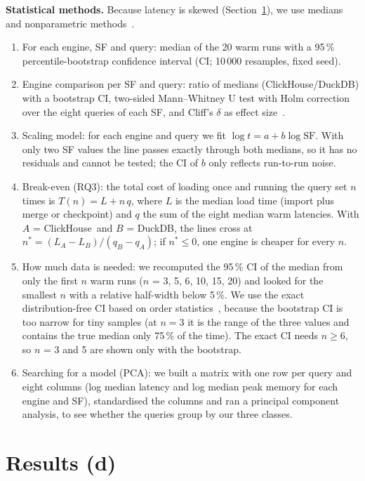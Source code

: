 \documentclass[11pt,a4paper]{article}
\newcommand{\CH}{ClickHouse}
\newcommand{\DK}{DuckDB}
\begin{document}
\textbf{Statistical methods.} Because latency is skewed (Section~\ref{sec:results}), we use medians and nonparametric methods~\cite{hoefler}.
\begin{enumerate}[leftmargin=1.5em]
\item For each engine, SF and query: median of the 20 warm runs with a 95\,\% percentile-bootstrap confidence interval (CI; 10\,000 resamples, fixed seed).
\item Engine comparison per SF and query: ratio of medians (\CH/\DK) with a bootstrap CI, two-sided Mann--Whitney U test with Holm correction over the eight queries of each SF, and Cliff's $\delta$ as effect size~\cite{romano}.
\item Scaling model: for each engine and query we fit $\log t = a + b \log \mathrm{SF}$.
With only two SF values the line passes exactly through both medians, so it has no residuals and cannot be tested; the CI of $b$ only reflects run-to-run noise.
\item Break-even (RQ3): the total cost of loading once and running the query set $n$ times is $T(n) = L + n\,q$, where $L$ is the median load time (import plus merge or checkpoint) and $q$ the sum of the eight median warm latencies.
With $A$ = \CH\ and $B$ = \DK, the lines cross at $n^* = (L_A - L_B)/(q_B - q_A)$; if $n^* \le 0$, one engine is cheaper for every $n$.
\item How much data is needed: we recomputed the 95\,\% CI of the median from only the first $n$ warm runs ($n$ = 3, 5, 6, 10, 15, 20) and looked for the smallest $n$ with a relative half-width below 5\,\%.
We use the exact distribution-free CI based on order statistics~\cite{leboudec}, because the bootstrap CI is too narrow for tiny samples (at $n = 3$ it is the range of the three values and contains the true median only 75\,\% of the time). The exact CI needs $n \ge 6$, so $n$ = 3 and 5 are shown only with the bootstrap.
\item Searching for a model (PCA): we built a matrix with one row per query and eight columns (log median latency and log median peak memory for each engine and SF), standardised the columns and ran a principal component analysis, to see whether the queries group by our three classes.
\end{enumerate}

\section{Results (d)}
\label{sec:results}
\end{document}
